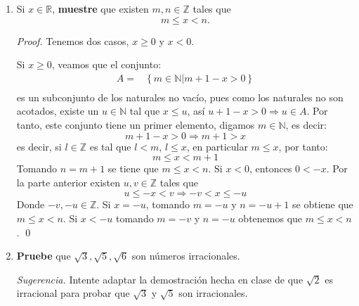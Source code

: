 \documentclass[12pt]{article}
\begin{document}
\begin{enumerate}
\begin{proof}
        Aplicando inducción, el resultado se cumple para toda $m\in\mathbb{N}$.
        \qed
    \end{proof}
    \item Si $x\in\mathbb{R}$, \textbf{muestre} que existen $m,n\in\mathbb{Z}$ tales que
    \begin{equation*}
        m\leq x<n.
    \end{equation*}
    \begin{proof}
        Tenemos dos casos, $x\geq 0$ y $x<0$.
        
        Si $x\geq 0$, veamos que el conjunto:
        \begin{equation*}
            \begin{split}
                A=&\left\{m\in\mathbb{N}|m+1-x> 0\right\}\\
            \end{split}
        \end{equation*}
        es un subconjunto de los naturales no vacío, pues como los naturales no son acotados, existe un $u\in\mathbb{N}$ tal que $x\leq u$, así $u+1-x> 0\Rightarrow u\in A$. Por tanto, este conjunto tiene un primer elemento, digamos $m\in\mathbb{N}$, es decir:
        \begin{equation*}
            m+1-x>0\Rightarrow m+1>x
        \end{equation*}
        es decir, si $l\in\mathbb{Z}$ es tal que $l<m$, $l\leq x$, en particular $m\leq x$, por tanto:
        \begin{equation*}
            m\leq x < m+1
        \end{equation*}
        Tomando $n=m+1$ se tiene que $m\leq x < n$.
        Si $x<0$, entonces $0<-x$. Por la parte anterior existen $u,v\in\mathbb{Z}$ tales que
        \begin{equation*}
            u\leq -x<v\Rightarrow -v<x\leq-u
        \end{equation*}
        Donde $-v,-u\in\mathbb{Z}$. Si $x=-u$, tomando $m=-u$ y $n=-u+1$ se obtiene que $m\leq x < n$. Si $x<-u$ tomando $m=-v$ y $n=-u$ obtenemos que $m\leq x<n$.
        \qed
    \end{proof}
    \item \textbf{Pruebe} que $\sqrt{3}, \sqrt{5}, \sqrt{6}$ son números irracionales.
    
    \textit{Sugerencia.} Intente adaptar la demostración hecha en clase de que $\sqrt{2}$ es irracional para probar que $\sqrt{3}$ y $\sqrt{5}$ son irracionales.


\end{enumerate}
\end{document}
